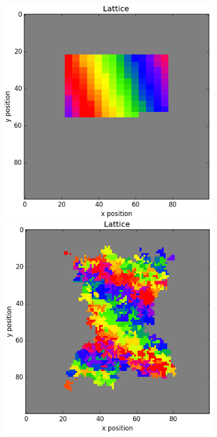\documentclass[12pt]{article}
\begin{document}
\begin{figure}[H]
	\centering
	\includegraphics[scale=0.52]{img/nebula_0}
	\includegraphics[scale=0.52]{img/nebula_5000}

\end{figure}
\end{document}
